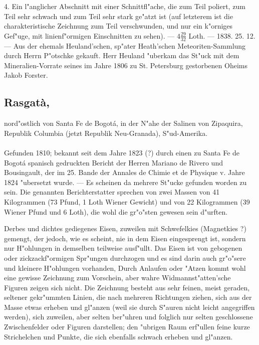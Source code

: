 \documentclass[a4paper, 11pt, oneside, polutonikogreek, german]{article}
\begin{document}
4. Ein l"anglicher Abschnitt mit einer Schnittfl"ache, die zum Teil poliert, zum Teil sehr schwach und zum Teil sehr stark ge"atzt ist (auf letzterem ist die charakteristische Zeichnung zum Teil verschwunden, und nur ein k"orniges Gef"uge, mit linienf"ormigen Einschnitten zu sehen). --- $4\frac{29}{32}$ Loth. --- 1838. 25. 12. --- Aus der ehemals Heuland'schen, sp"ater Heath'schen Meteoriten-Sammlung durch Herrn P"otschke gekauft. Herr Heuland "uberkam das St"uck mit dem Mineralien-Vorrate seines im Jahre 1806 zu St. Petersburg gestorbenen Oheims Jakob Forster.
\subsection[Rasgatà.]{Rasgatà,}
\begin{center}
\small
nord"ostlich von Santa Fe de Bogotá, in der N"ahe der Salinen von Zipaquira, Republik Columbia (jetzt Republik Neu-Granada), S"ud-Amerika.
\end{center}
\paragraph{}
Gefunden 1810; bekannt seit dem Jahre 1823 (?) durch einen zu Santa Fe de Bogotá spanisch gedruckten Bericht der Herren Mariano de Rivero und Bousingault, der im 25. Bande der Annales de Chimie et de Physique v. Jahre 1824 "ubersetzt wurde. --- Es scheinen da mehrere St"ucke gefunden worden zu sein. Die genannten Berichterstatter sprechen von zwei Massen von 41 Kilogrammen (73 Pfund, 1 Loth Wiener Gewicht) und von 22 Kilogrammen (39 Wiener Pfund und 6 Loth), die wohl die gr"o"sten gewesen sein d"urften.

Derbes und dichtes gediegenes Eisen, zuweilen mit Schwefelkies (Magnetkies ?) gemengt, der jedoch, wie es scheint, nie in dem Eisen eingesprengt ist, sondern nur H"ohlungen in demselben teilweise ausf"ullt. Das Eisen ist von gebogenen oder zickzackf"ormigen Spr"ungen durchzogen und es sind darin auch gr"o"sere und kleinere H"ohlungen vorhanden, Durch Anlaufen oder "Atzen kommt wohl eine gewisse Zeichnung zum Vorschein, aber wahre Widmannst"atten'sche Figuren zeigen sich nicht. Die Zeichnung besteht aus sehr feinen, meist geraden, seltener gekr"ummten Linien, die nach mehreren Richtungen ziehen, sich aus der Masse etwas erheben und gl"anzen (weil sie durch S"auren nicht leicht angegriffen werden), sich zuweilen, aber selten ber"uhren und folglich nur selten geschlossene Zwischenfelder oder Figuren darstellen; den "ubrigen Raum erf"ullen feine kurze Strichelchen und Punkte, die sich ebenfalls schwach erheben und gl"anzen.
\end{document}
